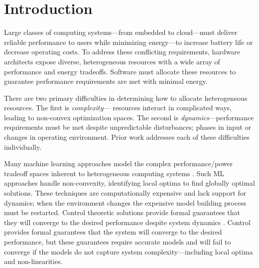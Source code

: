 \section{Introduction}
Large classes of computing systems---from embedded to cloud---must
deliver reliable performance to users while minimizing energy---to
increase battery life or decrease operating costs.  To address these
conflicting requirements, hardware architects expose diverse,
heterogeneous resources with a wide array of performance and energy
tradeoffs.  Software must allocate these resources to
guarantee performance requirements are met with minimal energy.


There are two primary difficulties in determining how to allocate
heterogeneous resources.  The first is \emph{complexity}---
resources interact in complicated ways, leading to non-convex
optimization spaces.  The second is \emph{dynamics}---perfor\-mance
requirements must be met despite unpredictable disturbances; \eg{}
phases in input or changes in operating environment.  Prior work
addresses each of these difficulties individually.

Many machine learning approaches model the complex performance/power
tradeoff spaces inherent to heterogeneous computing systems
\cite{reddiHPCA2013,dubach2010,Bitirgen2008,Ipek,Koala,LEO,Flicker,Ponamarev,Paragon}.
Such ML approaches handle non-convexity, identifying local optima to
find globally optimal solutions. These techniques are computationally
expensive and lack support for dynamics; \ie{} when the environment
changes the expensive model building process must be restarted.
Control theoretic solutions provide formal guarantees that they will
converge to the desired performance despite system dynamics
\cite{Hellerstein2004a,Chen2011,POET,ControlWare,Agilos,grace2,JouleGuard}.
Control provides formal guarantees that the system will converge to
the desired performance, but these guarantees require accurate models
and will fail to converge if the models do not capture system
complexity---including local optima and non-linearities.



